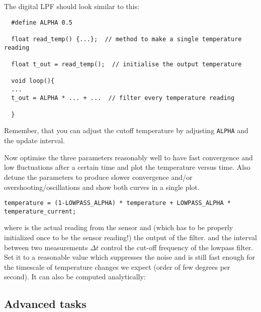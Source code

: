 %
The digital \ac{LPF} should look similar to this:
\begin{verbatim}
  #define ALPHA 0.5
  
  float read_temp() {...};  // method to make a single temperature reading
  
  float t_out = read_temp();  // initialise the output temperature
  
  void loop(){
  ...
  t_out = ALPHA * ... + ...  // filter every temperature reading
  
  }
\end{verbatim}
Remember, that you can adjust the cutoff temperature by adjusting \texttt{ALPHA} and the update interval.\par
%
\begin{task}
  Now optimise the three parameters reasonably well to have fast convergence and low fluctuations after a certain time and plot the temperature versus time. Also detune the parameters to produce slower convergence and/or overshooting/oscillations and show both curves in a single plot.
\end{task}
%
\noindent\begin{minipage}{\textwidth}
\begin{lstlisting}[language=Arduino]
temperature = (1-LOWPASS_ALPHA) * temperature + LOWPASS_ALPHA * temperature_current;
\end{lstlisting}
\end{minipage}

where  is the actual reading from the sensor and  (which has to be properly initialized once to be the sensor reading!) the output of the filter.  and the interval between two measurements $\Delta t$ control the cut-off frequency of the lowpass filter. Set it to a reasonable value which suppresses the noise and is still fast enough for the timescale of temperature changes we expect (order of few degrees per second). It can also be computed analytically:


%
\subsection{Advanced tasks}




